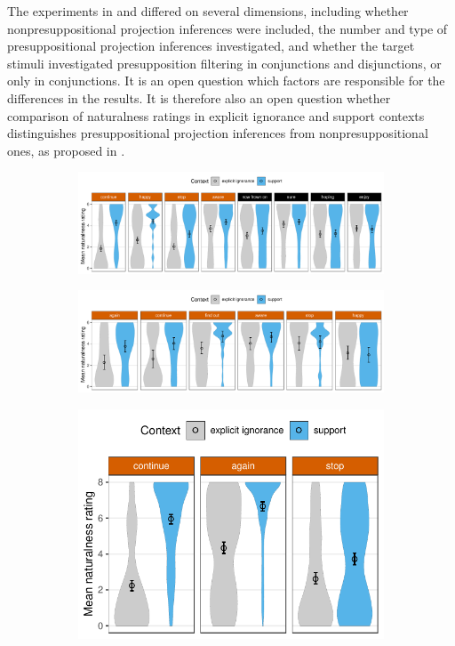 \documentclass[11pt,fleqn]{article}
\newcommand{\6}{\mbox{$[\hspace*{-.6mm}[$}}
\newcommand{\9}{\mbox{$]\hspace*{-.6mm}]$}}
\begin{document}
The experiments in \citealt{mandelkern-etal2020} and \citealt{kalomoiros-schwarz2024} differed on several dimensions, including whether nonpresuppositional projection inferences were included, the number and type of presuppositional projection inferences investigated, and whether the target stimuli investigated presupposition filtering in conjunctions and disjunctions, or only in conjunctions. It is an open question which factors are responsible for the differences in the results. It is therefore also an open question whether comparison of naturalness ratings in explicit ignorance and support contexts distinguishes presuppositional projection inferences from nonpresuppositional ones, as proposed in \citealt{mandelkern-etal2020}.

\begin{figure}[h!]
\centering
\begin{subfigure}{1\textwidth}
\centering
\includegraphics[width=.9\textwidth]{../../../mandelkern-etal2020/graphs/naturalness-by-context-and-expression}
\caption{\citealt[Exp.~3]{mandelkern-etal2020}}
\end{subfigure}

\begin{subfigure}{1\textwidth}
\centering
\includegraphics[width=.9\textwidth]{../../../kalomoiros-schwarz2024/exp1/graphs/naturalness-by-context-and-expression} 
\caption{\citealt[Exp.~1]{kalomoiros-schwarz2024}}
\end{subfigure}

\begin{subfigure}{1\textwidth}
\centering
\includegraphics[width=.37\textwidth]{../../../kalomoiros-schwarz2024/exp2/graphs/naturalness-by-context-and-expression}
\caption{\citealt[Exp.~2]{kalomoiros-schwarz2024}}
\end{subfigure}


\end{figure}
\end{document}
